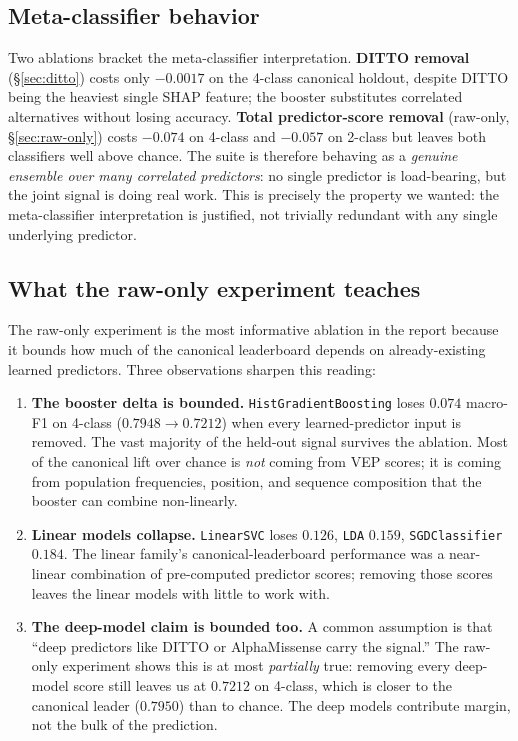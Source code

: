 \documentclass[11pt,a4paper]{article}
\begin{document}
\subsection{Meta-classifier behavior}

Two ablations bracket the meta-classifier interpretation. \textbf{DITTO
removal} (\S\ref{sec:ditto}) costs only $-0.0017$ on the 4-class canonical
holdout, despite DITTO being the heaviest single SHAP feature; the booster
substitutes correlated alternatives without losing accuracy.
\textbf{Total predictor-score removal} (raw-only, \S\ref{sec:raw-only}) costs
$-0.074$ on 4-class and $-0.057$ on 2-class but leaves both classifiers well
above chance. The suite is therefore behaving as a \emph{genuine ensemble
over many correlated predictors}: no single predictor is load-bearing, but
the joint signal is doing real work. This is precisely the property we
wanted: the meta-classifier interpretation is justified, not trivially
redundant with any single underlying predictor.

\subsection{What the raw-only experiment teaches}

The raw-only experiment is the most informative ablation in the report
because it bounds how much of the canonical leaderboard depends on
already-existing learned predictors. Three observations sharpen this
reading:
\begin{enumerate}[leftmargin=*]
    \item \textbf{The booster delta is bounded.}
          \texttt{HistGradientBoosting} loses $0.074$ macro-F1 on 4-class
          ($0.7948 \to 0.7212$) when every learned-predictor input is
          removed. The vast majority of the held-out signal survives the
          ablation. Most of the canonical lift over chance is \emph{not}
          coming from VEP scores; it is coming from population frequencies,
          position, and sequence composition that the booster can combine
          non-linearly.
    \item \textbf{Linear models collapse.} \texttt{LinearSVC} loses $0.126$,
          \texttt{LDA} $0.159$, \texttt{SGDClassifier} $0.184$. The linear
          family's canonical-leaderboard performance was a near-linear
          combination of pre-computed predictor scores; removing those
          scores leaves the linear models with little to work with.
    \item \textbf{The deep-model claim is bounded too.} A common assumption
          is that ``deep predictors like DITTO or AlphaMissense carry the
          signal.'' The raw-only experiment shows this is at most
          \emph{partially} true: removing every deep-model score still
          leaves us at $0.7212$ on 4-class, which is closer to the canonical
          leader ($0.7950$) than to chance. The deep models contribute
          margin, not the bulk of the prediction.
\end{enumerate}
\end{document}
